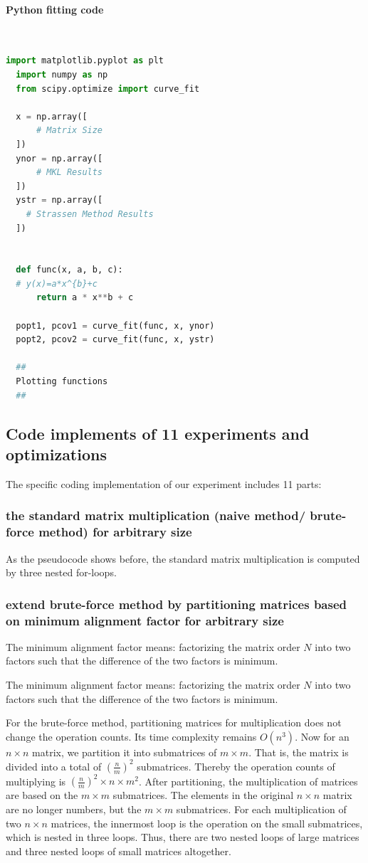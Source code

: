 \documentclass[UTF8]{ctexart}
\begin{document}
\paragraph{Python fitting code}~{}\\
\begin{lstlisting}[language=Python,style=python]
  import matplotlib.pyplot as plt
  import numpy as np
  from scipy.optimize import curve_fit

  x = np.array([
      # Matrix Size
  ])
  ynor = np.array([
      # MKL Results
  ])
  ystr = np.array([
    # Strassen Method Results
  ])


  def func(x, a, b, c):
  # y(x)=a*x^{b}+c
      return a * x**b + c

  popt1, pcov1 = curve_fit(func, x, ynor)
  popt2, pcov2 = curve_fit(func, x, ystr)

  ##
  Plotting functions
  ##
\end{lstlisting}

\subsection{Code implements of 11 experiments and optimizations}
The specific coding implementation of our experiment includes 11 parts:

\subsubsection{the standard matrix multiplication (naive method/ brute-force
  method) for arbitrary size}

As the pseudocode shows before, the standard matrix multiplication is
computed by three nested for-loops.
\subsubsection{extend brute-force method by partitioning matrices based on
  minimum alignment factor for arbitrary size}

The minimum alignment factor means: factorizing the matrix order \(N\)
into two factors such that the difference of the two factors is
minimum.

The minimum alignment factor means: factorizing the matrix order $N$ into two factors such that the difference of the two factors is minimum.

For the brute-force method, partitioning matrices for multiplication does not change the operation counts. Its time complexity remains $O(n^3)$. Now for an $n\times n$ matrix, we partition it into submatrices of $m\times m$. That is, the matrix is divided into a total of $(\frac{n}{m})^2$ submatrices. Thereby the operation counts of multiplying is $(\frac{n}{m})^2\times n\times m^2$. After partitioning, the multiplication of matrices are based on the $m \times m$ submatrices. The elements in the original $n\times n$ matrix are no longer numbers, but the $m\times m$ submatrices. For each multiplication of two $n\times n$ matrices, the innermost loop is the operation on the small submatrices, which is nested in three loops. Thus, there are two nested loops of large matrices and three nested loops of small matrices altogether.
\end{document}
